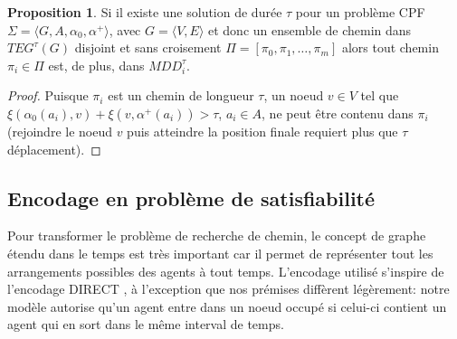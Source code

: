 \documentclass[french, 10pt, letterpaper]{article}
\theoremstyle{definition}
\theoremstyle{proposition}
\newtheorem{proposition}[definition]{Proposition}
\theoremstyle{example}
\begin{document}
    \begin{proposition}
        Si il existe une solution de durée $\tau$ pour un problème CPF $\Sigma = \langle G, A, \alpha_0, \alpha^+ \rangle$,
        avec $G = \langle V, E \rangle$
        et donc un ensemble de chemin dans $TEG^\tau(G)$ disjoint et sans croisement $\Pi = [\pi_0, \pi_1, \ldots, \pi_m]$ alors tout chemin
        $\pi_i \in \Pi$ est, de plus, dans $MDD^\tau_i$.
    \end{proposition}

    \begin{proof}
        Puisque $\pi_i$ est un chemin de longueur $\tau$, un noeud $v \in V$ tel que $\xi(\alpha_0(a_i), v) + \xi(v, \alpha^+(a_i)) > \tau$, $a_i \in A$,
        ne peut être contenu dans $\pi_i$ (rejoindre le noeud $v$ puis atteindre la position finale requiert plus que $\tau$ déplacement).
    \end{proof}

    

    \subsection{Encodage en problème de satisfiabilité}
    \label{sec:encoding}

    Pour transformer le problème de recherche de chemin, le concept de graphe étendu dans le temps est très important car
    il permet de représenter tout les arrangements possibles des agents à tout temps.
    L'encodage utilisé s'inspire de l'encodage DIRECT \cite{PSURDIRECT}, à l'exception que nos prémises diffèrent légèrement:
    notre modèle autorise qu'un agent entre dans un noeud occupé si celui-ci contient un agent qui en sort dans le même interval de temps.
\end{document}
